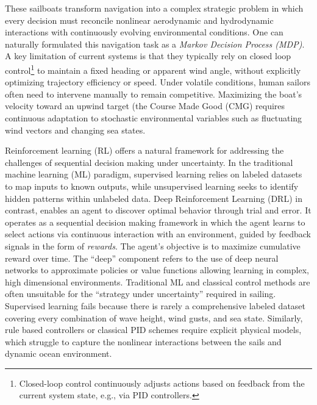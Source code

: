 \justify These sailboats transform navigation into a complex strategic problem in which every decision must reconcile nonlinear aerodynamic and hydrodynamic interactions with continuously evolving environmental conditions. One can naturally formulated this navigation task as a \emph{Markov Decision Process (MDP)}. A key limitation of current systems is that they typically rely on closed loop control\footnote{Closed-loop control continuously adjusts actions based on feedback from the current system state, e.g., via PID controllers.}  to maintain a fixed heading or apparent wind angle, without explicitly optimizing trajectory efficiency or speed. Under volatile conditions, human sailors often need to intervene manually to remain competitive. Maximizing the boat's velocity toward an upwind target (the Course Made Good (CMG) requires continuous adaptation to stochastic environmental variables such as fluctuating wind vectors and changing sea states.




\justify Reinforcement learning (RL) offers a natural framework for addressing the challenges of sequential decision making under uncertainty. In the traditional machine learning (ML) paradigm, supervised learning relies on labeled datasets to map inputs to known outputs, while unsupervised learning seeks to identify hidden patterns within unlabeled data. Deep Reinforcement Learning (DRL) in contrast, enables an agent to discover optimal behavior through trial and error. It operates as a sequential decision making framework in which the agent learns to select actions via continuous interaction with an environment, guided by feedback signals in the form of \emph{rewards}. The agent's objective is to maximize cumulative reward over time. The “deep” component refers to the use of deep neural networks to approximate policies or value functions allowing learning in complex, high dimensional environments. Traditional ML and classical control methods are often unsuitable for the “strategy under uncertainty” required in sailing. Supervised learning fails because there is rarely a comprehensive labeled dataset covering every combination of wave height, wind gusts, and sea state. Similarly, rule based controllers or classical PID schemes require explicit physical models, which struggle to capture the nonlinear interactions between the sails and dynamic ocean environment.



